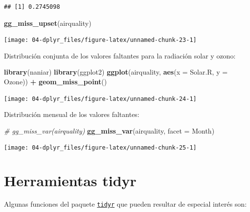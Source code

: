\documentclass[
]{book}
\newenvironment{Shaded}{\begin{snugshade}}{\end{snugshade}}
\newcommand{\AttributeTok}[1]{\textcolor[rgb]{0.13,0.29,0.53}{#1}}
\newcommand{\CommentTok}[1]{\textcolor[rgb]{0.56,0.35,0.01}{\textit{#1}}}
\newcommand{\FunctionTok}[1]{\textcolor[rgb]{0.13,0.29,0.53}{\textbf{#1}}}
\newcommand{\NormalTok}[1]{#1}
\newcommand{\SpecialCharTok}[1]{\textcolor[rgb]{0.81,0.36,0.00}{\textbf{#1}}}
\begin{document}
\begin{verbatim}
## [1] 0.2745098
\end{verbatim}

\begin{Shaded}
\begin{Highlighting}[]
\FunctionTok{gg\_miss\_upset}\NormalTok{(airquality) }
\end{Highlighting}
\end{Shaded}

\begin{center}\texttt{[image: 04-dplyr\_files/figure-latex/unnamed-chunk-23-1]} \end{center}

Distribución conjunta de los valores faltantes para la radiación solar y ozono:

\begin{Shaded}
\begin{Highlighting}[]
\FunctionTok{library}\NormalTok{(naniar)}
\FunctionTok{library}\NormalTok{(ggplot2)}
\FunctionTok{ggplot}\NormalTok{(airquality, }
       \FunctionTok{aes}\NormalTok{(}\AttributeTok{x =}\NormalTok{ Solar.R, }
           \AttributeTok{y =}\NormalTok{ Ozone)) }\SpecialCharTok{+} 
  \FunctionTok{geom\_miss\_point}\NormalTok{()}
\end{Highlighting}
\end{Shaded}

\begin{center}\texttt{[image: 04-dplyr\_files/figure-latex/unnamed-chunk-24-1]} \end{center}

Distribución mensual de los valores faltantes:

\begin{Shaded}
\begin{Highlighting}[]
\CommentTok{\# gg\_miss\_var(airquality)}
\FunctionTok{gg\_miss\_var}\NormalTok{(airquality, }\AttributeTok{facet =}\NormalTok{ Month)}
\end{Highlighting}
\end{Shaded}

\begin{center}\texttt{[image: 04-dplyr\_files/figure-latex/unnamed-chunk-25-1]} \end{center}

\section{Herramientas tidyr}\label{tidyr-pkg}

Algunas funciones del paquete \href{https://tidyr.tidyverse.org}{\texttt{tidyr}} que pueden resultar de especial interés son:
\end{document}
